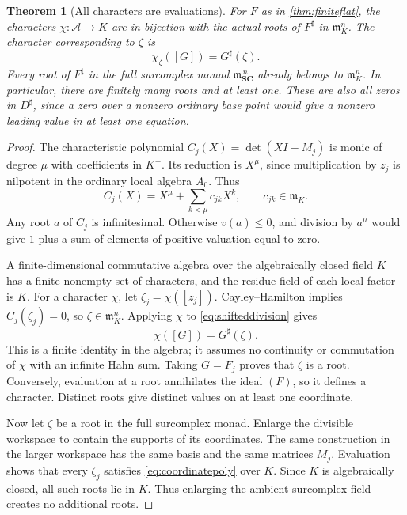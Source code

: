 \documentclass[11pt,letterpaper]{article}
\newtheorem{theorem}{Theorem}[section]
\theoremstyle{definition}
\theoremstyle{remark}
\newcommand{\SC}{\mathbf{SC}}
\newcommand{\mm}{\mathfrak m}
\newcommand{\sh}{^{\sharp}}
\newcommand{\Kp}{K^{+}}
\begin{document}
\begin{theorem}[All characters are evaluations]\label{thm:characters}
For $F$ as in \cref{thm:finiteflat}, the characters $\chi:\mathcal A\to K$ are in bijection with the actual roots of $F\sh$ in $\mm_K^n$. The character corresponding to $\zeta$ is
\[
 \chi_\zeta([G])=G\sh(\zeta).
\]
Every root of $F\sh$ in the full surcomplex monad $\mm_{\SC}^{\,n}$ already belongs to $\mm_K^n$. In particular, there are finitely many roots and at least one. These are also all zeros in $D\sh$, since a zero over a nonzero ordinary base point would give a nonzero leading value in at least one equation.
\end{theorem}
\begin{proof}
The characteristic polynomial $C_j(X)=\det(XI-M_j)$ is monic of degree $\mu$ with coefficients in $\Kp$. Its reduction is $X^\mu$, since multiplication by $z_j$ is nilpotent in the ordinary local algebra $A_0$. Thus
\begin{equation}\label{eq:coordinatepoly}
 C_j(X)=X^\mu+\sum_{k<\mu}c_{jk}X^k,
 \qquad c_{jk}\in\mm_K.
\end{equation}
Any root $a$ of $C_j$ is infinitesimal. Otherwise $v(a)\leq0$, and division by $a^\mu$ would give $1$ plus a sum of elements of positive valuation equal to zero.

A finite-dimensional commutative algebra over the algebraically closed field $K$ has a finite nonempty set of characters, and the residue field of each local factor is $K$. For a character $\chi$, let $\zeta_j=\chi([z_j])$. Cayley--Hamilton implies $C_j(\zeta_j)=0$, so $\zeta\in\mm_K^n$. Applying $\chi$ to \eqref{eq:shifteddivision} gives
\[
 \chi([G])=G\sh(\zeta).
\]
This is a finite identity in the algebra; it assumes no continuity or commutation of $\chi$ with an infinite Hahn sum. Taking $G=F_j$ proves that $\zeta$ is a root. Conversely, evaluation at a root annihilates the ideal $(F)$, so it defines a character. Distinct roots give distinct values on at least one coordinate.

Now let $\zeta$ be a root in the full surcomplex monad. Enlarge the divisible workspace to contain the supports of its coordinates. The same construction in the larger workspace has the same basis and the same matrices $M_j$. Evaluation shows that every $\zeta_j$ satisfies \eqref{eq:coordinatepoly} over $K$. Since $K$ is algebraically closed, all such roots lie in $K$. Thus enlarging the ambient surcomplex field creates no additional roots.
\end{proof}
\end{document}
